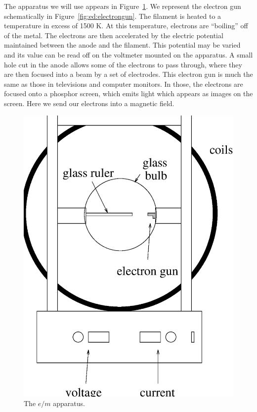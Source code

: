The apparatus we will use appears in Figure~\ref{fig:ed:apparatus}.
We represent the electron gun schematically in Figure~\ref{fig:ed:electrongun}.
The filament is heated to a temperature in excess of 1500 K. At this 
temperature, electrons are ``boiling'' off of the metal. The electrons are then
accelerated by the electric potential maintained between the anode and the 
filament. This potential may be varied and its value can be read off on the 
voltmeter mounted on the apparatus.  A small hole cut in the anode allows some
of the electrons to pass through, where they are then focused into a beam by a 
set of electrodes. This electron gun is much the same as those in televisions 
and computer monitors. In those, the electrons are focused onto a phosphor 
screen, which emits light which appears as images on the screen. Here we send
our electrons into a magnetic field.
\begin{figure}[htb]
\centering \epsfxsize=8cm \includegraphics[scale=0.6]{3_electrondynamics/emapparatus.eps}
\caption{The $e/m$ apparatus.}
\label{fig:ed:apparatus}
\end{figure}
